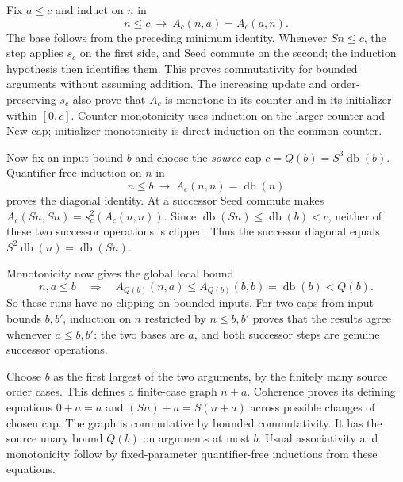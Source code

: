 \documentclass[11pt,letterpaper]{article}
\theoremstyle{definition}\newtheorem{definition}[theorem]{Definition}
\theoremstyle{remark}\newtheorem{remark}[theorem]{Remark}
\begin{document}
Fix $a\le c$ and induct on $n$ in
\[
 n\le c\ \longrightarrow\ A_c(n,a)=A_c(a,n).
\]
The base follows from the preceding minimum identity. Whenever $Sn\le c$,
the step applies $s_c$ on the first side, and Seed commute on the
second; the induction hypothesis then identifies them. This proves
commutativity for bounded arguments without assuming addition.
The increasing update and order-preserving $s_c$ also prove that
$A_c$ is monotone in its counter and in its initializer within $[0,c]$.
Counter monotonicity uses induction on the larger counter and New-cap;
initializer monotonicity is direct induction on the common counter.

Now fix an input bound $b$ and choose the \emph{source} cap
$c=Q(b)=S^3\operatorname{db}(b)$. Quantifier-free induction on $n$ in
\[
 n\le b\ \longrightarrow\ A_c(n,n)=\operatorname{db}(n)
\]
proves the diagonal identity. At a successor Seed commute makes
$A_c(Sn,Sn)=s_c^2(A_c(n,n))$. Since
$\operatorname{db}(Sn)\le\operatorname{db}(b)<c$, neither of these
two successor operations is clipped. Thus the successor diagonal
equals $S^2\operatorname{db}(n)=\operatorname{db}(Sn)$.

Monotonicity now gives the global local bound
\[
 n,a\le b\quad\Longrightarrow\quad
 A_{Q(b)}(n,a)\le A_{Q(b)}(b,b)
   =\operatorname{db}(b)<Q(b).
 \tag{Addition bound}
\]
So these runs have no clipping on bounded inputs. For two caps from
input bounds $b,b'$, induction on $n$ restricted by $n\le b,b'$
proves that the results agree whenever $a\le b,b'$: the two bases
are $a$, and both successor steps are genuine successor operations.

Choose $b$ as the first largest of the two arguments, by the finitely
many source order cases. This defines a finite-case graph $n+a$.
Coherence proves its defining equations
$0+a=a$ and $(Sn)+a=S(n+a)$ across possible changes of chosen cap.
The graph is commutative by bounded commutativity. It has the
source unary bound $Q(b)$ on arguments at most $b$.
Usual associativity and monotonicity follow by fixed-parameter
quantifier-free inductions from these equations.
\end{document}
